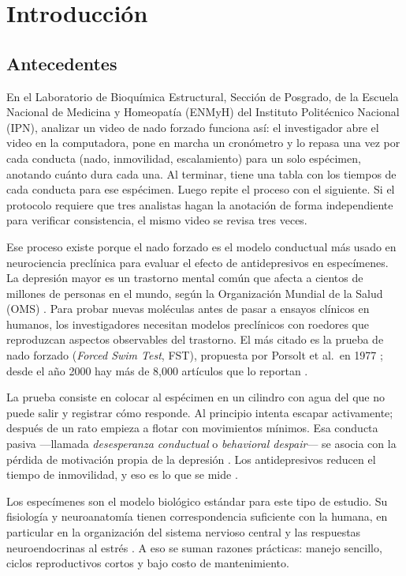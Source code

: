 \chapter{Introducción}

\section{Antecedentes}

En el Laboratorio de Bioquímica Estructural, Sección de Posgrado, de la Escuela Nacional de
Medicina y Homeopatía (ENMyH) del Instituto Politécnico Nacional (IPN), analizar un video de nado forzado funciona así: el investigador abre
el video en la computadora, pone en marcha un cronómetro y lo repasa una vez por cada
conducta (nado, inmovilidad, escalamiento) para un solo espécimen, anotando cuánto dura
cada una. Al terminar, tiene una tabla con los tiempos de cada conducta para ese
espécimen. Luego repite el proceso con el siguiente. Si el protocolo requiere que tres analistas hagan la anotación de
forma independiente para verificar consistencia, el mismo video se revisa tres veces.

Ese proceso existe porque el nado forzado es el modelo conductual más usado en
neurociencia preclínica para evaluar el efecto de antidepresivos en especímenes. La depresión
mayor es un trastorno mental común que afecta a cientos de millones de personas en el
mundo, según la Organización Mundial de la Salud (OMS) \cite{who_depression_2025}. Para probar nuevas moléculas
antes de pasar a ensayos clínicos en humanos, los investigadores necesitan modelos
preclínicos con roedores que reproduzcan aspectos observables del trastorno. El más
citado es la prueba de nado forzado (\textit{Forced Swim Test}, FST), propuesta por Porsolt et al.\ en 1977
\cite{porsolt1977}; desde el año 2000 hay más de 8{,}000 artículos que lo reportan
\cite{della_valle2025}.

La prueba consiste en colocar al espécimen en un cilindro con agua del que no puede
salir y registrar cómo responde. Al principio intenta escapar activamente; después de
un rato empieza a flotar con movimientos mínimos. Esa conducta pasiva ---llamada
\textit{desesperanza conductual} o \textit{behavioral despair}--- se asocia con la
pérdida de motivación propia de la depresión \cite{armario2021}. Los antidepresivos
reducen el tiempo de inmovilidad, y eso es lo que se mide \cite{slattery2012}.

Los especímenes son el modelo biológico estándar para este tipo de estudio. Su fisiología y
neuroanatomía tienen correspondencia suficiente con la humana, en particular en la
organización del sistema nervioso central y las respuestas neuroendocrinas al estrés
\cite{armario2021}. A eso se suman razones prácticas: manejo sencillo, ciclos
reproductivos cortos y bajo costo de mantenimiento.

